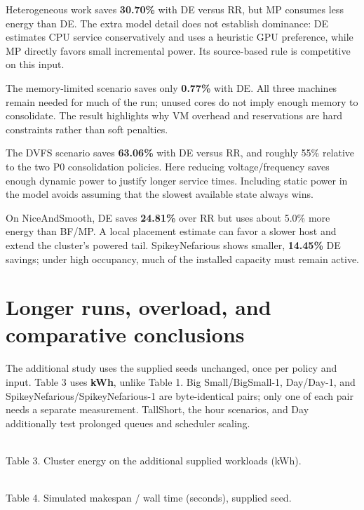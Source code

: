 \documentclass[10pt,letterpaper]{article}
\begin{document}
Heterogeneous work saves \textbf{30.70\%} with DE versus RR, but MP consumes less
energy than DE. The extra model detail does not establish dominance: DE estimates
CPU service conservatively and uses a heuristic GPU preference, while MP directly
favors small incremental power. Its source-based rule is competitive on this input.

The memory-limited scenario saves only \textbf{0.77\%} with DE. All three machines
remain needed for much of the run; unused cores do not imply enough memory to
consolidate. The result highlights why VM overhead and reservations are hard
constraints rather than soft penalties.

The DVFS scenario saves \textbf{63.06\%} with DE versus RR, and roughly 55\%
relative to the two P0 consolidation policies. Here reducing voltage/frequency
saves enough dynamic power to justify longer service times. Including static
power in the model avoids assuming that the slowest available state always wins.

On NiceAndSmooth, DE saves \textbf{24.81\%} over RR but uses about 5.0\% more energy
than BF/MP. A local placement estimate can favor a slower host and extend the
cluster's powered tail. SpikeyNefarious shows smaller, \textbf{14.45\%} DE savings;
under high occupancy, much of the installed capacity must remain active.

\newpage
\small
\section*{Longer runs, overload, and comparative conclusions}
The additional study uses the supplied seeds unchanged, once per policy and input.
Table 3 uses \textbf{kWh}, unlike Table 1. Big Small/BigSmall-1, Day/Day-1, and
SpikeyNefarious/SpikeyNefarious-1 are byte-identical pairs; only one of each pair
needs a separate measurement. TallShort, the hour scenarios, and Day additionally
test prolonged queues and scheduler scaling.

\begin{center}
\small

\\[3pt]Table 3. Cluster energy on the additional supplied workloads (kWh).
\end{center}
\begin{center}
\small

\\[3pt]Table 4. Simulated makespan / wall time (seconds), supplied seed.
\end{center}
\end{document}
